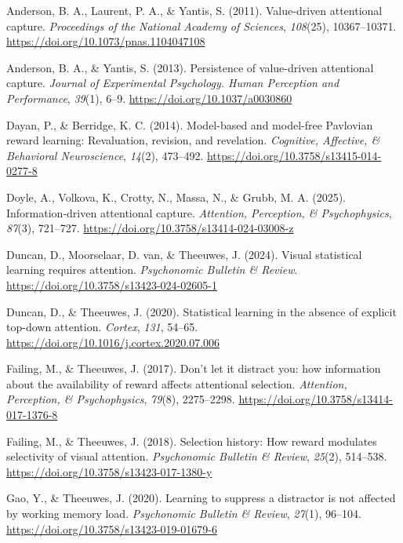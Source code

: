 \documentclass[
  jou,
  floatsintext,
  longtable,
  nolmodern,
  notxfonts,
  notimes,
  colorlinks=true,linkcolor=blue,citecolor=blue,urlcolor=blue]{apa7}
\newlength{\cslhangindent}
\newenvironment{CSLReferences}[2] %
 {\begin{list}{}{%
  \setlength{\itemindent}{0pt}
  \setlength{\leftmargin}{0pt}
  \setlength{\parsep}{0pt}
  \ifodd #1
   \setlength{\leftmargin}{\cslhangindent}
   \setlength{\itemindent}{-1\cslhangindent}
  \fi
  \setlength{\itemsep}{#2\baselineskip}}}
 {\end{list}}
\begin{document}
\begin{CSLReferences}{1}{0}
Anderson, B. A., Laurent, P. A., \& Yantis, S. (2011). Value-driven
attentional capture. \emph{Proceedings of the National Academy of
Sciences}, \emph{108}(25), 10367--10371.
\url{https://doi.org/10.1073/pnas.1104047108}

Anderson, B. A., \& Yantis, S. (2013). Persistence of value-driven
attentional capture. \emph{Journal of Experimental Psychology. Human
Perception and Performance}, \emph{39}(1), 6--9.
\url{https://doi.org/10.1037/a0030860}

Dayan, P., \& Berridge, K. C. (2014). Model-based and model-free
Pavlovian reward learning: Revaluation, revision, and revelation.
\emph{Cognitive, Affective, \& Behavioral Neuroscience}, \emph{14}(2),
473--492. \url{https://doi.org/10.3758/s13415-014-0277-8}

Doyle, A., Volkova, K., Crotty, N., Massa, N., \& Grubb, M. A. (2025).
Information-driven attentional capture. \emph{Attention, Perception, \&
Psychophysics}, \emph{87}(3), 721--727.
\url{https://doi.org/10.3758/s13414-024-03008-z}

Duncan, D., Moorselaar, D. van, \& Theeuwes, J. (2024). Visual
statistical learning requires attention. \emph{Psychonomic Bulletin \&
Review}. \url{https://doi.org/10.3758/s13423-024-02605-1}

Duncan, D., \& Theeuwes, J. (2020). Statistical learning in the absence
of explicit top-down attention. \emph{Cortex}, \emph{131}, 54--65.
\url{https://doi.org/10.1016/j.cortex.2020.07.006}

Failing, M., \& Theeuwes, J. (2017). Don{'}t let it distract you: how
information about the availability of reward affects attentional
selection. \emph{Attention, Perception, \& Psychophysics}, \emph{79}(8),
2275--2298. \url{https://doi.org/10.3758/s13414-017-1376-8}

Failing, M., \& Theeuwes, J. (2018). Selection history: How reward
modulates selectivity of visual attention. \emph{Psychonomic Bulletin \&
Review}, \emph{25}(2), 514--538.
\url{https://doi.org/10.3758/s13423-017-1380-y}

Gao, Y., \& Theeuwes, J. (2020). Learning to suppress a distractor is
not affected by working memory load. \emph{Psychonomic Bulletin \&
Review}, \emph{27}(1), 96--104.
\url{https://doi.org/10.3758/s13423-019-01679-6}


\end{CSLReferences}
\end{document}
